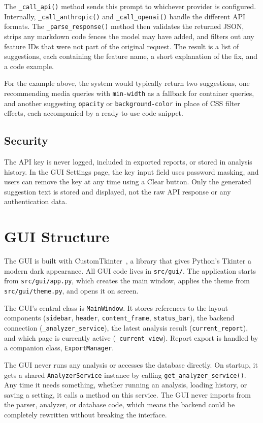 The \texttt{\_call\_api()} method sends this prompt to whichever provider is configured. Internally, \texttt{\_call\_anthropic()} and \texttt{\_call\_openai()} handle the different API formats. The \texttt{\_parse\_response()} method then validates the returned JSON, strips any markdown code fences the model may have added, and filters out any feature IDs that were not part of the original request. The result is a list of suggestions, each containing the feature name, a short explanation of the fix, and a code example.

For the example above, the system would typically return two suggestions, one recommending media queries with \texttt{min-width} as a fallback for container queries, and another suggesting \texttt{opacity} or \texttt{background-color} in place of CSS filter effects, each accompanied by a ready-to-use code snippet.

\subsection{Security}

The API key is never logged, included in exported reports, or stored in analysis history. In the GUI Settings page, the key input field uses password masking, and users can remove the key at any time using a Clear button. Only the generated suggestion text is stored and displayed, not the raw API response or any authentication data.

\section{GUI Structure}
\label{sec:gui}

The GUI is built with CustomTkinter~\cite{customtkinter}, a library that gives Python's Tkinter a modern dark appearance. All GUI code lives in \texttt{src/gui/}. The application starts from \texttt{src/gui/app.py}, which creates the main window, applies the theme from \texttt{src/gui/theme.py}, and opens it on screen.

The GUI's central class is \texttt{MainWindow}. It stores references to the layout components (\texttt{sidebar}, \texttt{header}, \texttt{content\_frame}, \texttt{status\_bar}), the backend connection (\texttt{\_analyzer\_service}), the latest analysis result (\texttt{current\_report}), and which page is currently active (\texttt{\_current\_view}). Report export is handled by a companion class, \texttt{ExportManager}.

The GUI never runs any analysis or accesses the database directly. On startup, it gets a shared \texttt{AnalyzerService} instance by calling \texttt{get\_analyzer\_service()}. Any time it needs something, whether running an analysis, loading history, or saving a setting, it calls a method on this service. The GUI never imports from the parser, analyzer, or database code, which means the backend could be completely rewritten without breaking the interface.

